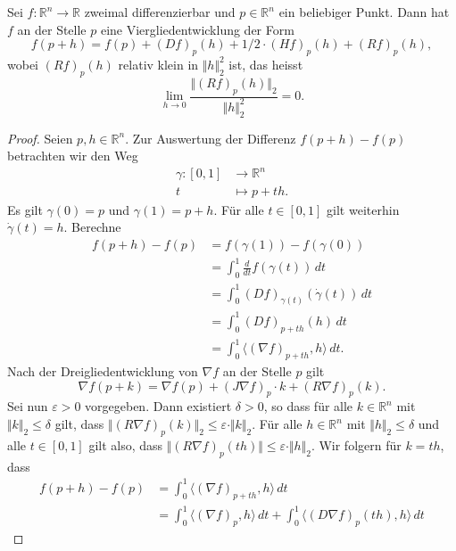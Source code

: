 \documentclass[../main.tex]{subfiles}
\begin{document}
\begin{proposition}[Viergliedentwicklung]
  Sei $f \colon \mathbb{R}^n \to \mathbb{R}$ zweimal differenzierbar
  und $p \in \mathbb{R}^n$ ein beliebiger Punkt.
  Dann hat $f$ an der Stelle $p$ eine Viergliedentwicklung
  der Form
  \[
    f(p + h) = f(p) + {(Df)}_p(h) + 1/2 \cdot {(Hf)}_p (h) + {(Rf)}_p(h),
  \]
  wobei ${(Rf)}_p(h)$ relativ klein in $\Vert h \Vert_2^2$ ist,
  das heisst
  \[
    \lim_{h \to 0} \frac{\Vert {(Rf)}_p(h) \Vert_2}{\Vert h \Vert_2^2} = 0.
  \]
\end{proposition}

\begin{proof}
  Seien $p, h \in \mathbb{R}^n$.
  Zur Auswertung der Differenz
  $f(p + h) - f(p)$ betrachten wir den
  Weg
  \begin{align*}
    \gamma \colon [0, 1] & \to \mathbb{R}^n \\
    t & \mapsto p + th.
  \end{align*}
  Es gilt $\gamma(0) = p$ und $\gamma(1) = p + h$.
  Für alle $t \in [0, 1]$ gilt weiterhin $\dot \gamma(t) = h$.
  Berechne
  \begin{align*}
   f(p + h) - f(p)
   &= f( \gamma(1))  -f(\gamma(0))  \\
   &= \int_{0}^{1} \frac{d}{dt} f(\gamma(t)) \, dt \\
   &= \int_{0}^{1} {(Df)}_{\gamma(t)}( \dot \gamma(t)) \, dt \\
   &= \int_{0}^{1} {(Df)}_{p + th}(h) \, dt \\
   &= \int_{0}^{1} \langle {(\nabla f)}_{p + th}, h \rangle \, dt.
  \end{align*}
  Nach der Dreigliedentwicklung von $\nabla f$ an der Stelle $p$ gilt
  \[
    \nabla f (p + k ) = \nabla f(p) + {(J \nabla f)}_p \cdot k +
    {(R \nabla f)}_p (k).
  \]
  Sei nun $\varepsilon > 0$ vorgegeben.
  Dann existiert $\delta > 0$,
  so dass für alle $k \in \mathbb{R}^n$ mit $\Vert k \Vert_2 \leq \delta$
  gilt, dass $\Vert {(R \nabla f)}_p(k) \Vert_2 \leq \varepsilon \cdot
  \Vert k \Vert_2$.
  Für alle $h \in \mathbb{R}^n$ mit $\Vert h \Vert_2 \leq \delta$
  und alle $t \in [0, 1]$ gilt also, dass
  $\Vert {(R \nabla f)}_p (th) \Vert \leq \varepsilon \cdot \Vert h \Vert_2$.
  Wir folgern für $k = th$, dass
  \begin{align*}
    f(p + h) - f(p)
    & = \int_{0}^{1} \langle {(\nabla f)}_{p + th}, h \rangle \, dt\\
    &= \int_{0}^{1} \langle {(\nabla f)}_p , h \rangle \, dt
    + \int_{0}^{1} \langle {(D \nabla f)}_p (th), h \rangle \, dt

\end{align*}
\end{proof}
\end{document}
